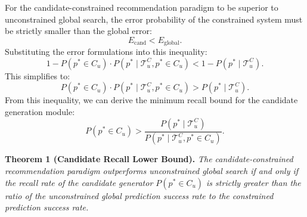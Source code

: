 \documentclass[10pt,twocolumn]{article}
\begin{document}
For the candidate-constrained recommendation paradigm to be superior to unconstrained global search, the error probability of the constrained system must be strictly smaller than the global error:
\begin{equation}
    E_{\mathrm{cand}} < E_{\mathrm{global}}.
\end{equation}
Substituting the error formulations into this inequality:
\begin{equation}
    1 - P(p^* \in C_u) \cdot P(p^* \mid \mathcal{T}^C_u, p^* \in C_u) < 1 - P(p^* \mid \mathcal{T}^C_u).
\end{equation}
This simplifies to:
\begin{equation}
    P(p^* \in C_u) \cdot P(p^* \mid \mathcal{T}^C_u, p^* \in C_u) > P(p^* \mid \mathcal{T}^C_u).
\end{equation}
From this inequality, we can derive the minimum recall bound for the candidate generation module:
\begin{equation}
    P(p^* \in C_u) > \frac{P(p^* \mid \mathcal{T}^C_u)}{P(p^* \mid \mathcal{T}^C_u, p^* \in C_u)}.
    \label{eq:recall_bound}
\end{equation}

\noindent\textbf{Theorem 1 (Candidate Recall Lower Bound).} \emph{The candidate-constrained recommendation paradigm outperforms unconstrained global search if and only if the recall rate of the candidate generator $P(p^* \in C_u)$ is strictly greater than the ratio of the unconstrained global prediction success rate to the constrained prediction success rate.}
\end{document}
